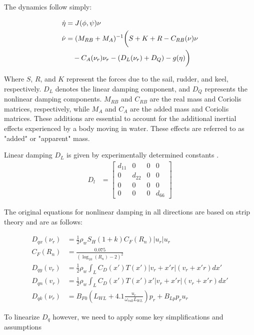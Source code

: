 \documentclass[conference]{IEEEtran}
\begin{document}
The dynamics follow simply:

\begin{align} 
    \dot{\eta} &= J(\phi, \psi) \nu \\
    \dot{\nu} &= (M_{RB} + M_A)^{-1} \bigg(S + K + R - C_{RB}(\nu)\nu \\
                &\quad - C_A(\nu_r)\nu_r - (D_L(\nu_r) + D_Q) - g(\eta)\bigg) \notag
\end{align}

Where $S$, $R$, and $K$ represent the forces due to the sail, rudder, and keel, respectively. $D_L$ denotes the linear damping component, and $D_Q$ represents the nonlinear damping components. $M_{RB}$ and $C_{RB}$ are the real mass and Coriolis matrices, respectively, while $M_A$ and $C_A$ are the added mass and Coriolis matrices. These additions are essential to account for the additional inertial effects experienced by a body moving in water. These effects are referred to as "added" or "apparent" mass.

Linear damping $D_L$ is given by experimentally determined constants \cite{fossen2011handbook}.
\begin{align}
D_l &= \begin{bmatrix}
d_{11} & 0 & 0 & 0 \\
0 & d_{22} & 0 & 0 \\
0 & 0 & 0 & 0 \\
0 & 0 & 0 & d_{66}
\end{bmatrix}
\end{align}

The original equations for nonlinear damping in all directions are based on strip theory and are as follows:

\begin{align}
D_{qx}(\nu_r) &= \frac{1}{2} \rho_w S_{H} (1 + k) C_{F}(R_n) |u_r| u_r \\
C_{F}(R_n) &= \frac{0.075}{(\log_{10}(R_n) - 2)^2} \\
D_{qy}(v_r) &= \frac{1}{2} \rho_w \int_L C_D(x') T(x')|v_r + x' r|(v_r + x' r)  dx' \\
D_{qn}(v_r) &= \frac{1}{2} \rho_w \int_L C_D(x') T(x')x'|v_r + x' r|(v_r + x' r)  dx' \\
D_{qk}(\nu_r) &= B_{F0} \left( L_{WL} + 4.1 \frac{u_r}{\omega_{roll} L_{WL}} \right) p_r + B_{Lp} p_r u_r
\end{align}


To linearize $D_q$ however, we need to apply some key simplifications and assumptions
\end{document}
